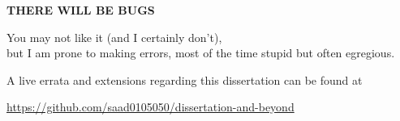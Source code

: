 {\singlespacing

}
\newpage


\thispagestyle{plain}

\begin{center}
{\large\bf THERE WILL BE BUGS}
\vspace{1in}
\end{center}




\begin{center}
You may not like it (and I certainly don't), \\
but I am prone to making errors, 
most of the time stupid but often egregious. 

A live errata and extensions regarding this dissertation 
can be found at 

  \url{https://github.com/saad0105050/dissertation-and-beyond}
\end{center}

\newpage

